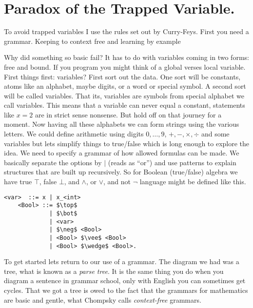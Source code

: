 
\section{Paradox of the Trapped Variable.}

To avoid trapped variables I use the rules set out by Curry-Feys.
First you need a grammar.  Keeping to context free and learning by example

Why did something so basic fail?  It has to do with variables coming in 
two forms: free and bound.  If you program you might think of a global 
verses local variable.  First things first: variables?
First sort out the data.  One sort will be constants, atoms like an alphabet,
maybe digits, or a word or special symbol. A second sort will be called variables.
That its, variables are symbols from special alphabet we call variables.
This means that a variable can never equal a constant, statements like $x=2$ 
are in strict sense nonsense.  But hold off on that journey for a moment.
Now having all these alphabets we can form strings using the various letters.
We could define arithmetic using digits $0,\ldots, 9$, $+,-,\times,\div$ and some 
variables but lets simplify things to true/false which is long enough to 
explore the idea.  We need to specify a grammar of how allowed formulas can 
be made.  We basically separate the options by $\mid$ (reads as ``or'')
and use patterns to explain structures that are built up recursively.
So for Boolean (true/false) algebra we have true $\top$, false $\bot$, 
and $\wedge$, or $\vee$, and not $\neg$ language might be defined like this.
\newpage    
\begin{lstfloat}
\begin{lstlisting}[mathescape]
    <var>  ::= x | x_<int>
    <Bool> ::= $\top$ 
             | $\bot$ 
             | <var>
             | $\neg$ <Bool> 
             | <Bool> $\vee$ <Bool> 
             | <Bool> $\wedge$ <Bool>.
\end{lstlisting}
\end{lstfloat}

To get started lets return to our use of a grammar.  The diagram we had 
was a tree, what is known as a \emph{parse tree}.  It is the same thing you 
do when you diagram a sentence in grammar school, only with English you can 
sometimes get cycles.  That we got a tree is owed to the fact that the grammars 
for mathematics are basic and gentle, what Chompsky calls \emph{context-free} grammars.


